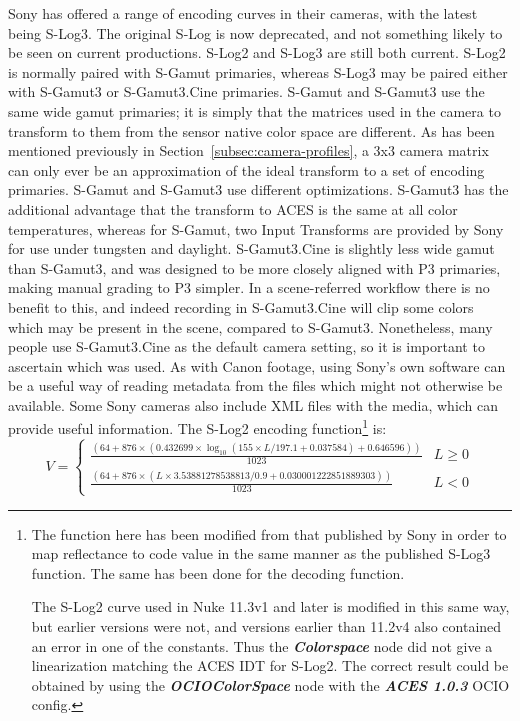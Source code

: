 Sony has offered a range of encoding curves in their cameras, with the latest being S-Log3.
The original S-Log is now deprecated, and not something likely to be seen on current productions.
S-Log2 and S-Log3 are still both current.
S-Log2 is normally paired with S-Gamut primaries, whereas S-Log3 may be paired either with S-Gamut3 or S-Gamut3.Cine primaries.
\ccPar{}
S-Gamut and S-Gamut3 use the same wide gamut primaries; it is simply that the matrices used in the camera to transform to them from the sensor native color space are different.
As has been mentioned previously in Section~\ref{subsec:camera-profiles}, a 3x3 camera matrix can only ever be an approximation of the ideal transform to a set of encoding primaries.
S-Gamut and S-Gamut3 use different optimizations.
S-Gamut3 has the additional advantage that the transform to ACES is the same at all color temperatures, whereas for S-Gamut, two Input Transforms are provided by Sony for use under tungsten and daylight.
S-Gamut3.Cine is slightly less wide gamut than S-Gamut3, and was designed to be more closely aligned with P3 primaries, making manual grading to P3 simpler.
In a scene-referred workflow there is no benefit to this, and indeed recording in S-Gamut3.Cine will clip some colors which may be present in the scene, compared to S-Gamut3.
Nonetheless, many people use S-Gamut3.Cine as the default camera setting, so it is important to ascertain which was used.
\ccPar{}
As with Canon footage, using Sony's own software can be a useful way of reading metadata from the files which might not otherwise be available.
Some Sony cameras also include XML files with the media, which can provide useful information.
\ccPar{}
The S-Log2 encoding function\footnote{The function here has been modified from that published by Sony in order to map reflectance to code value in the same manner as the published S-Log3 function.
The same has been done for the decoding function.

The S-Log2 curve used in Nuke 11.3v1 and later is modified in this same way, but earlier versions were not, and versions earlier than 11.2v4 also contained an error in one of the constants.
Thus the \textbf{\textit{Colorspace}} node did not give a linearization matching the ACES IDT for S-Log2.
The correct result could be obtained by using the \textbf{\textit{OCIOColorSpace}} node with the \textbf{\textit{ACES 1.0.3}} OCIO config.} is:
\begin{equation}
    V =
    \begin{cases}
        \frac{(64 + 876 \times (0.432699 \times \log _{10}(155 \times L / 197.1 + 0.037584) + 0.646596))}{1023} & L \geq 0 \\
        \frac{(64 + 876 \times (L \times 3.53881278538813 / 0.9 + 0.030001222851889303))}{1023} & L < 0
    \end{cases}
\end{equation}

